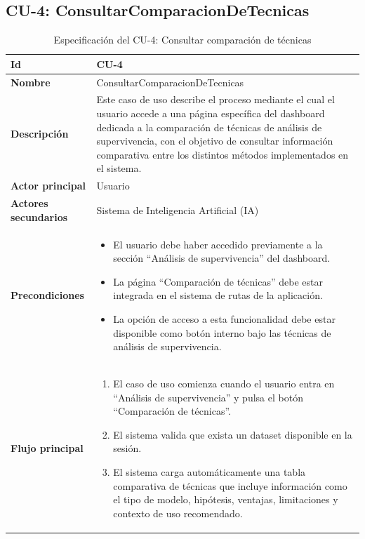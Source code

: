     \subsection{CU-4: ConsultarComparacionDeTecnicas}

\begin{longtable}{|p{4cm}|p{10cm}|}
\caption{Especificación del CU-4: Consultar comparación de técnicas}
\label{tab:esp_cu4}\\
\hline
\textbf{Id} & CU-4 \\ \hline
\textbf{Nombre} & ConsultarComparacionDeTecnicas \\ \hline

\textbf{Descripción} & 
Este caso de uso describe el proceso mediante el cual el usuario accede a una página específica del dashboard dedicada a la comparación de técnicas de análisis de supervivencia, con el objetivo de consultar información comparativa entre los distintos métodos implementados en el sistema. \\ \hline

\textbf{Actor principal} & Usuario \\ \hline
\textbf{Actores secundarios} & Sistema de Inteligencia Artificial (IA) \\ \hline

\textbf{Precondiciones} & 
\begin{itemize}
    \item El usuario debe haber accedido previamente a la sección ``Análisis de supervivencia'' del dashboard.
    \item La página ``Comparación de técnicas'' debe estar integrada en el sistema de rutas de la aplicación.
    \item La opción de acceso a esta funcionalidad debe estar disponible como botón interno bajo las técnicas de análisis de supervivencia.
\end{itemize} \\ \hline

\textbf{Flujo principal} & 
\begin{enumerate}
    \item El caso de uso comienza cuando el usuario entra en ``Análisis de supervivencia'' y pulsa el botón ``Comparación de técnicas''.
    
    \item El sistema valida que exista un dataset disponible en la sesión.
    
    \item El sistema carga automáticamente una tabla comparativa de técnicas que incluye información como el tipo de modelo, hipótesis, ventajas, limitaciones y contexto de uso recomendado.
    

\end{enumerate}
\end{longtable}
